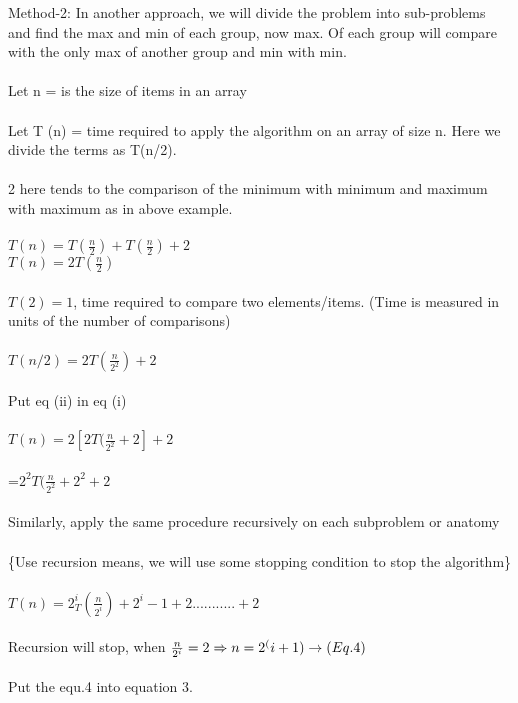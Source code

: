 \documentclass{article}
\begin{document}
Method-2: In another approach, we will divide the problem into sub-problems and find the max and min of each group, now max. Of each group will compare with the only max of another group and min with min.\\
\\
Let n = is the size of items in an array\\
\\
Let T (n) = time required to apply the algorithm on an array of size n. Here we divide the terms as T(n/2).\\
\\
2  here tends to the comparison of the minimum with minimum and maximum with maximum as in above example.\\
\\
$T(n)=T(\frac{n}{2})+T(\frac{n}{2})+2$\\
$T(n)=2 T(\frac{n}{2})$\\
\\
$T (2) = 1$, time required to compare two elements/items. (Time is measured in units of the number of comparisons)
\\
\\
$ T(n/2)=2T(\frac{n}{2^2})+2$\\
\\
Put eq (ii) in eq (i)\\
\\
$T(n) =2[2T(\frac{n}{2^2}+2]+2$\\
	   \\  =$2^2T(\frac{n}{2^2}+2^2+2$\\
	   \\
Similarly, apply the same procedure recursively on each subproblem or anatomy\\
\\
\{Use recursion means, we will use some stopping condition to stop the algorithm\}\\
\\
$T(n)=2_T^i(\frac{n}{2^i})+2^i-1+2...........+2$\\
\\
Recursion will stop, when $\frac{n}{2^i}=2\\
\Rightarrow n = 2^(i+1)\rightarrow(Eq. 4)$\\
\\
Put the equ.4 into equation 3.\\
\end{document}
